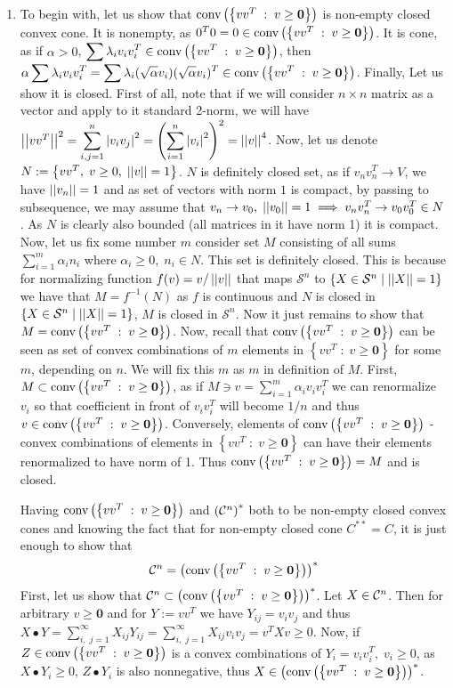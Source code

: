 \documentclass[8pt]{article} %
\begin{document}
\begin{enumerate}[label=\bfseries Problem \arabic*]
{\begin{enumerate}[label=(\alph*)]
{			$v^TX_0v$ is also nonnegative. As $v$ was arbitrary, this shows that $X_0\in\myset$ and latter is thus closed.
				}
			\item{To begin with, let us show that $\mbox{conv}\left(\left\{vv^T\;:\;v\geq\mathbf{0}\right\}\right)$ is non-empty closed convex cone. It is nonempty, as
				$0^T0=0\in\mbox{conv}\left(\left\{vv^T\;:\;v\geq\mathbf{0}\right\}\right)$. It is cone, as if $\alpha>0$, $\sum\lambda_iv_iv_i^T\in\conv$, then
				$\alpha\sum\lambda_iv_iv_i^T=\sum\lambda_i(\sqrt{\alpha}v_i)(\sqrt{\alpha}v_i)^T\in\conv$. Finally,
				Let us show it is closed. First of all, note that if we will consider $n\times n$ matrix as a vector
				and apply to it standard 2-norm, we will have $\mynorm{vv^T}^2=\sum_{i,j=1}^n\myabs{v_iv_j}^2=
				\left(\sum_{i=1}^n\myabs{v_i}^2\right)^2=\mynorm{v}^4$. 
				Now, let us denote $N:=\left\{
				vv^T,\;v\geq 0,\;\left|\left|v\right|\right|=1\right\}$. $N$ is definitely closed set, as if $v_nv_n^T\to V$, we have
				$\left|\left|v_n\right|\right|=1$ and as set of vectors with norm $1$ is compact, by passing to subsequence,
				we may assume that $v_n\to v_0,\;\left|\left|v_0\right|\right|=1\implies v_nv_n^T\to v_0v_0^T\in N$. As $N$ is clearly
				also bounded (all matrices in it have norm 1) it is compact. Now, let us fix some number $m$
				consider set $M$ consisting
				of all sums $\sum_{i=1}^m \alpha_i n_i$ where $\alpha_i\geq 0,\;n_i\in N$. This set is definitely
				closed. This is because for normalizing function $f(v)=v/\left|\left|v\right|\right|$ that maps $\mathcal{S}^n$ to
				$\left\{X\in\mathcal{S}^n\mid \left|\left|X\right|\right|=1\right\}$ we have that $M=f^{-1}(N)$ as $f$ is continuous
				and $N$ is closed in $\left\{X\in\mathcal{S}^n\mid \left|\left|X\right|\right|=1\right\}$, $M$ is closed in $\mathcal{S}^n$.
				Now it just remains to show that $M=\mbox{conv}\left(\left\{vv^T\;:\;v\geq\mathbf{0}\right\}\right)$. Now, recall that $\mbox{conv}\left(\left\{vv^T\;:\;v\geq\mathbf{0}\right\}\right)$ can be seen as set of convex
				combinations of $m$ elements in $\left\{vv^T\;:\;v\geq\mathbf{0}\right\}$ for some $m$, depending on
				$n$. We will fix this $m$ as $m$ in definition of $M$. First, $M\subset\mbox{conv}\left(\left\{vv^T\;:\;v\geq\mathbf{0}\right\}\right)$, as if $
				M\ni v=\sum_{i=1}^m\alpha_iv_iv_i^T$ we can renormalize $v_i$ so that coefficient in front of
				$v_iv_i^T$ will become $1/n$ and thus $v\in\mbox{conv}\left(\left\{vv^T\;:\;v\geq\mathbf{0}\right\}\right)$. Conversely, elements of $\mbox{conv}\left(\left\{vv^T\;:\;v\geq\mathbf{0}\right\}\right)$ - convex
				combinations of elements in $\left\{vv^T\;:\;v\geq\mathbf{0}\right\}$ can have their elements
				renormalized to have norm of 1. Thus $\mbox{conv}\left(\left\{vv^T\;:\;v\geq\mathbf{0}\right\}\right)=M$ and is closed.

				Having $\mbox{conv}\left(\left\{vv^T\;:\;v\geq\mathbf{0}\right\}\right)$ and $\left(\mathcal{C}^n\right)^*$ both to be non-empty closed convex cones and knowing the fact
				that for non-empty closed cone $C^{**}=C$, it is just enough to show that
				\[\mathcal{C}^n=\left(\mbox{conv}\left(\left\{vv^T\;:\;v\geq\mathbf{0}\right\}\right)\right)^*\]
				First, let us show that $\mathcal{C}^n\subset\left(\mbox{conv}\left(\left\{vv^T\;:\;v\geq\mathbf{0}\right\}\right)\right)^*$. Let $X\in\mathcal{C}^n$. Then for
				arbitrary $v\geq\mathbf{0}$ and for $Y:=vv^T$ we have $Y_{ij}=v_iv_j$ and thus $X\bullet Y=
				\sum_{i,\;j=1}^{\infty}X_{ij}Y_{ij}=\sum_{i,\;j=1}^{\infty}X_{ij}v_iv_j=v^TXv\geq 0$. Now,
				if $Z\in\mbox{conv}\left(\left\{vv^T\;:\;v\geq\mathbf{0}\right\}\right)$ is a convex combinations of $Y_i=v_iv_i^T,\;v_i\geq 0$, as $X\bullet Y_i\geq 0$,
				$Z\bullet Y_i$ is also nonnegative, thus $X\in\left(\mbox{conv}\left(\left\{vv^T\;:\;v\geq\mathbf{0}\right\}\right)\right)^*$.

}
\end{enumerate}}
\end{enumerate}
\end{document}
